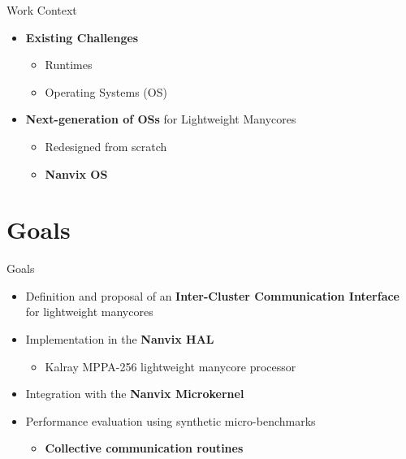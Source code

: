 	\begin{frame}[fragile]{Work Context}
		\begin{itemize}
			\item \textbf{Existing Challenges} %
			\begin{itemize}
				\item Runtimes
				\item Operating Systems (OS)
			\end{itemize}
			\item \textbf{Next-generation of OSs} for Lightweight Manycores
			\begin{itemize}
				\item Redesigned from scratch
				\item \textbf{Nanvix OS}
			\end{itemize}
		\end{itemize}

	\end{frame}

\section{Goals}

	\begin{frame}[fragile]{Goals}
		\begin{itemize}
			\item Definition and proposal of an \textbf{Inter-Cluster Communication Interface} for lightweight manycores
			\item Implementation in the \textbf{Nanvix HAL}
			\begin{itemize}
				\item Kalray MPPA-256 lightweight manycore processor
			\end{itemize}
			\item Integration with the \textbf{Nanvix Microkernel}
			\item Performance evaluation using synthetic micro-benchmarks
			\begin{itemize}
				\item \textbf{Collective communication routines}
			\end{itemize}
		\end{itemize}

	\end{frame}

